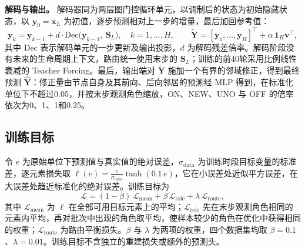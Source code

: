 \textbf{解码与输出。} 解码器同为两层图门控循环单元，以调制后的状态为初始隐藏状态，以 $\mathbf{y}_0=\bar{\mathbf{x}}_L$ 为初值，逐步预测相对上一步的增量，最后加回参考值：
\begin{equation}\label{eq:11}
\mathbf{y}_k=\mathbf{y}_{k-1}+d\cdot\mathrm{Dec}\big(\mathbf{y}_{k-1},\ \mathbf{S}_L\big),\quad k=1,\dots,H,\qquad \tilde{\mathbf{Y}}=[\mathbf{y}_1,\dots,\mathbf{y}_H]^{\top}+\alpha\,\mathbf{1}_H\mathbf{v}^{\top},
\end{equation}
其中 $\mathrm{Dec}$ 表示解码单元的一步更新及输出投影，$d$ 为解码残差倍率。解码阶段没有未来的生命周期上下文，路由统一使用末步的 $\mathbf{S}_L$；训练的前40轮采用比例线性衰减的 Teacher Forcing。最后，输出端对 $\tilde{\mathbf{Y}}$ 施加一个有界的邻域修正，得到最终预测 $\hat{\mathbf{Y}}$：修正量由节点自身及其前向、后向邻居的预测经 MLP 得到，在标准化单位下不超过0.05，并按末步观测角色缩放，ON、NEW、UNO 与 OFF 的倍率依次为0、1、1和0.25。

\subsection{训练目标}\label{sec:3_5}

令 $e$ 为原始单位下预测值与真实值的绝对误差，$\sigma_{\mathrm{data}}$ 为训练时段目标变量的标准差，逐元素损失取 $\ell(e)=\frac{e}{\sigma_{\mathrm{data}}}\tanh(0.1\,e)$，它在小误差处近似平方误差，在大误差处趋近标准化的绝对误差。训练目标为
\begin{equation}\label{eq:12}
\mathcal{L}=(1-\beta)\,\mathcal{L}_{\mathrm{mean}}+\beta\,\mathcal{L}_{\mathrm{role}}+\lambda\,\mathcal{L}_{\mathrm{route}},
\end{equation}
其中 $\mathcal{L}_{\mathrm{mean}}$ 为 $\ell$ 在全部可用目标元素上的平均；$\mathcal{L}_{\mathrm{role}}$ 先在末步观测角色相同的元素内平均，再对批次中出现的角色取平均，使样本较少的角色在优化中获得相同的权重；$\mathcal{L}_{\mathrm{route}}$ 为路由平衡损失。$\beta$ 与 $\lambda$ 为两项的权重，四个数据集均取 $\beta=0.1$、$\lambda=0.01$。训练目标不含独立的重建损失或额外的预测头。
